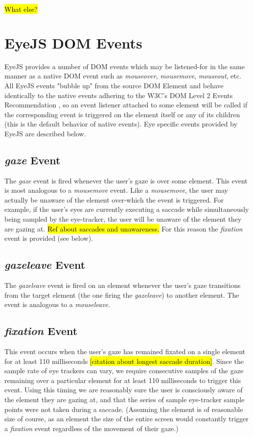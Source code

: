 \documentclass{sigchi}
\begin{document}
\hl{What else?}



\section{EyeJS DOM Events}
EyeJS provides a number of DOM events which may be listened-for in the same manner as a native DOM event such as \textit{mouseover}, \textit{mousemove}, \textit{mouseout}, etc. All EyeJS events "bubble up" from the source DOM Element and behave identically to the native events adhering to the W3C's DOM Level 2 Events Recommendation \cite{domlevel1, domlevel2}, so an event listener attached to some element will be called if the corresponding event is triggered on the element itself or any of its children (this is the default behavior of native events). Eye specific events provided by EyeJS are described below.

\subsection{\textbf{\textit{gaze}} Event}
The \textit{gaze} event is fired whenever the user's gaze is over some element. This event is most analogous to a \textit{mousemove} event. Like a \textit{mousemove}, the user may actually be unaware of the element over-which the event is triggered. For example, if the user's eyes are currently executing a saccade while simultaneously being sampled by the eye-tracker, the user will be unaware of the element they are gazing at. \hl{Ref about saccades and unawareness.} For this reason the \textit{fixation} event is provided (see below).

\subsection{\textbf{\textit{gazeleave}} Event}
The \textit{gazeleave} event is fired on an element whenever the user's gaze transitions from the target element (the one firing the \textit{gazeleave}) to another element. The event is analogous to a \textit{mouseleave}.

\subsection{\textbf{\textit{fixation}} Event}
This event occurs when the user's gaze has remained fixated on a single element for at least 110 milliseconds \hl{[citation about longest saccade duration]}. Since the sample rate of eye trackers can vary, we require consecutive samples of the gaze remaining over a particular element for at least 110 milliseconds to trigger this event. Using this timing we are reasonably sure the user is consciously aware of the element they are gazing at, and that the series of sample eye-tracker sample points were not taken during a saccade. (Assuming the element is of reasonable size of course, as an element the size of the entire screen would constantly trigger a \textit{fixation} event regardless of the movement of their gaze.)
\end{document}
